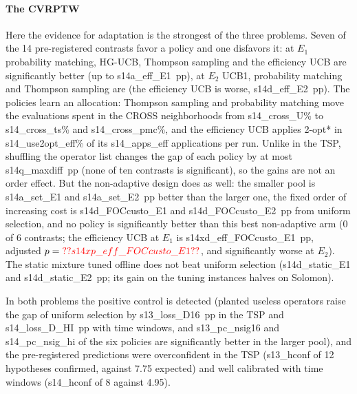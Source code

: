 \paragraph{The CVRPTW} Here the evidence for adaptation is the strongest of the three problems. Seven of the 14 pre-registered contrasts favor a policy and one disfavors it: at $E_1$ probability matching, HG-UCB, Thompson sampling and the efficiency UCB are significantly better (up to \num{s14a_eff_E1}~pp), at $E_2$ UCB1, probability matching and Thompson sampling are (the efficiency UCB is worse, \num{s14d_eff_E2}~pp). The policies learn an allocation: Thompson sampling and probability matching move the evaluations spent in the CROSS neighborhoods from \num{s14_cross_U}\% to \num{s14_cross_ts}\% and \num{s14_cross_pmc}\%, and the efficiency UCB applies 2-opt* in \num{s14_use2opt_eff}\% of its \num{s14_apps_eff} applications per run. Unlike in the TSP, shuffling the operator list changes the gap of each policy by at most \num{s14q_maxdiff}~pp (none of ten contrasts is significant), so the gains are not an order effect. But the non-adaptive design does as well: the smaller pool is \num{s14a_set_E1} and \num{s14a_set_E2}~pp better than the larger one, the fixed order of increasing cost is \num{s14d_FOCcusto_E1} and \num{s14d_FOCcusto_E2}~pp from uniform selection, and no policy is significantly better than this best non-adaptive arm (0 of 6 contrasts; the efficiency UCB at $E_1$ is \num{s14xd_eff_FOCcusto_E1}~pp, adjusted $p=\num{s14xp_eff_FOCcusto_E1}$, and significantly worse at $E_2$). The static mixture tuned offline does not beat uniform selection (\num{s14d_static_E1} and \num{s14d_static_E2}~pp; its gain on the tuning instances halves on Solomon).

In both problems the positive control is detected (planted useless operators raise the gap of uniform selection by \num{s13_loss_D16}~pp in the TSP and \num{s14_loss_D_HI}~pp with time windows, and \num{s13_pc_nsig16} and \num{s14_pc_nsig_hi} of the six policies are significantly better in the larger pool), and the pre-registered predictions were overconfident in the TSP (\num{s13_hconf} of 12 hypotheses confirmed, against 7.75 expected) and well calibrated with time windows (\num{s14_hconf} of 8 against 4.95).

